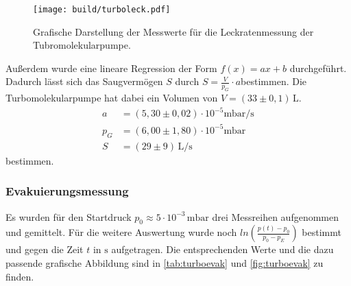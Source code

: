\begin{figure}[H]
  \centering
  \texttt{[image: build/turboleck.pdf]}
  \caption{Grafische Darstellung der Messwerte für die Leckratenmessung der Tubromolekularpumpe.}
  \label{fig:turboleck}
\end{figure}
Außerdem wurde eine lineare Regression der Form $f(x) = ax +b$ durchgeführt. Dadurch lässt sich das Saugvermögen
$S$ durch $S = \frac{V}{p_G}\cdot a$bestimmen. Die Turbomolekularpumpe hat dabei ein Volumen von
$V = (33 \pm 0,1) \,\si{\liter}$. 
\begin{align*}
  a &= (5,30 \pm 0,02)\cdot 10^{-5} \si{\milli\bar\per\second} \\
  p_G &= (6,00 \pm 1,80) \cdot 10^{-5} \si{\milli\bar} \\
  S &= (29 \pm 9)\,\si{\liter\per\second}
\end{align*}
bestimmen.

\subsubsection{Evakuierungsmessung}
Es wurden für den Startdruck $p_{0} \approx 5\cdot 10^{-3}\,\si{\milli\bar}$ drei Messreihen aufgenommen und
gemittelt. Für die weitere Auswertung wurde noch $ln(\frac{p(t)-p_0}{p_0 - p_E})$ bestimmt und gegen die Zeit
$t$ in $\si{\second}$ aufgetragen. Die entsprechenden Werte und die dazu passende grafische Abbildung sind in
\autoref{tab:turboevak} und \autoref{fig:turboevak} zu finden.

